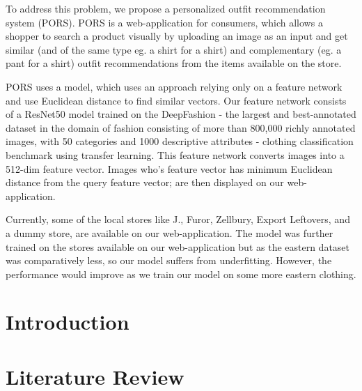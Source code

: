 \documentclass[12pt]{report}
\begin{document}
To address this problem, we propose a personalized outfit recommendation system (PORS). PORS is a web-application for consumers, which allows a shopper to search a product visually by uploading an image as an input and get similar (and of the same type eg. a shirt for a shirt) and complementary (eg. a pant for a shirt) outfit recommendations from the items available on the store.\newline

PORS uses a model, which uses an approach relying only on a feature network and use Euclidean distance to find similar vectors. Our feature network consists of a ResNet50 model trained on the DeepFashion - the largest and best-annotated dataset in the domain of fashion consisting of more than 800,000 richly annotated images, with 50 categories and 1000 descriptive attributes - clothing classification benchmark using transfer learning. This feature network converts images into a 512-dim feature vector. Images who’s feature vector has minimum Euclidean distance from the query feature vector; are then displayed on our web-application.\newline

Currently, some of the local stores like J., Furor, Zellbury, Export Leftovers, and a dummy store, are available on our web-application. The model was further trained on the stores available on our web-application but as the eastern dataset was comparatively less, so our model suffers from underfitting. However, the performance would improve as we train our model on some more eastern clothing. 

\tableofcontents
\listoffigures
\listoftables


\chapter{Introduction}
\label{chap:intro}


\chapter{Literature Review}
\label{chap:lit}

\end{document}
